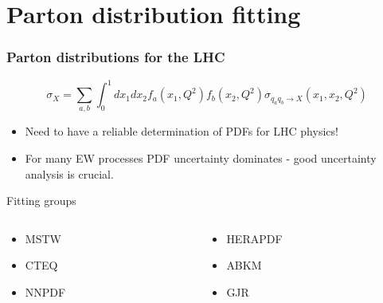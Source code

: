 \documentclass[10pt]{beamer}
\newcommand{\be}{\begin{equation*}}
\newcommand{\ee}{\end{equation*}}
\begin{document}
\section{Parton distribution fitting}
\begin{frame}
\frametitle{Parton distributions for the LHC}

\be \sigma_X= \sum_{a,b} \int_0^1 dx_1dx_2 f_a(x_1,Q^2)f_b(x_2,Q^2)\sigma_{q_aq_b \to X} \left( x_1,x_2,Q^2 \right) \ee
\begin{itemize}
		\item<1-> Need to have a reliable determination of PDFs for LHC physics!
		\item<1-> For many EW processes PDF uncertainty dominates - good uncertainty analysis is crucial.

\end{itemize}
\vskip15pt

\vskip15pt
\begin{block} {Fitting groups}

\begin{columns}
  \begin{column}{0.5\textwidth}
\begin{itemize}
  \setlength{\itemindent}{1em}

		\item<1->MSTW
		\item<1->CTEQ
		\item<1->NNPDF
	\end{itemize} 

	
	 \end{column}

  \begin{column}{0.5\textwidth}
\begin{itemize}
		\item<1->HERAPDF
		\item<1->ABKM
		\item<1->GJR
	\end{itemize}  \end{column}
\end{columns}
\end{block}


\end{frame}
\end{document}
